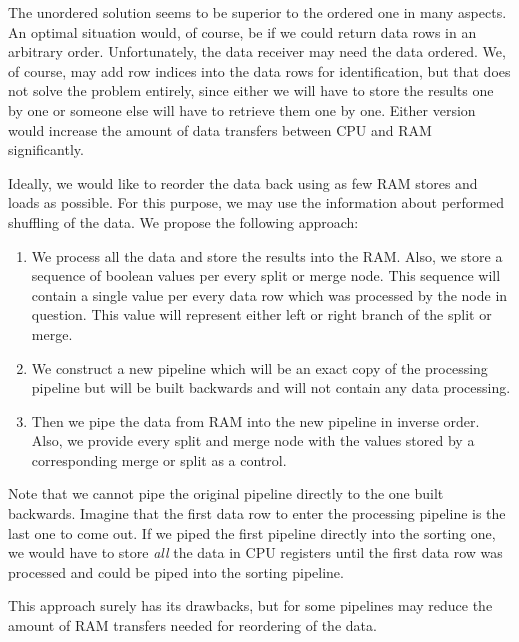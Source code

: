 The unordered solution seems to be superior to the ordered one in many aspects. An optimal situation would, of course, be if we could return data rows in an arbitrary order. Unfortunately, the data receiver may need the data ordered.  We, of course, may add row indices into the data rows for identification, but that does not solve the problem entirely, since either we will have to store the results one by one or someone else will have to retrieve them one by one. Either version would increase the amount of data transfers between CPU and RAM significantly. 


Ideally, we would like to reorder the data back using as few RAM stores and loads as possible. For this purpose, we may use the information about performed shuffling of the data. We propose the following approach:
\begin{enumerate}
  \item We process all the data and store the results into the RAM. Also, we store a sequence of boolean values per every split or merge node. This sequence will contain a single value per every data row which was processed by the node in question. This value will represent either left or right branch of the split or merge.
  \item We construct a new pipeline which will be an exact copy of the processing pipeline but will be built backwards and will not contain any data processing.
  \item Then we pipe the data from RAM into the new pipeline in inverse order. Also, we provide every split and merge node with the values stored by a corresponding merge or split as a control.
\end{enumerate}

\begin{rem}
  Note that we cannot pipe the original pipeline directly to the one built backwards. Imagine that the first data row to enter the processing pipeline is the last one to come out. If we piped the first pipeline directly into the sorting one, we would have to store \emph{all} the data in CPU registers until the first data row was processed and could be piped into the sorting pipeline.
\end{rem}

This approach surely has its drawbacks, but for some pipelines may reduce the amount of RAM transfers needed for reordering of the data.
